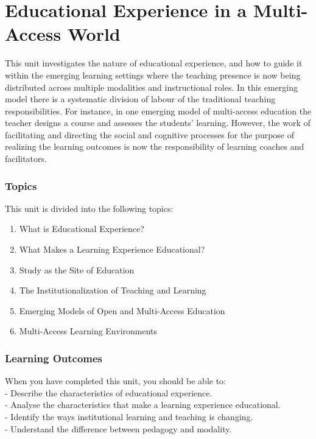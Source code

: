 \documentclass[
]{book}
\providecommand{\tightlist}{%
  \setlength{\itemsep}{0pt}\setlength{\parskip}{0pt}}
\begin{document}
\hypertarget{educational-experience-in-a-multi-access-world}{%
\chapter{Educational Experience in a Multi-Access World}\label{educational-experience-in-a-multi-access-world}}

This unit investigates the nature of educational experience, and how to guide it within the emerging learning settings where the teaching presence is now being distributed across multiple modalities and instructional roles. In this emerging model there is a systematic division of labour of the traditional teaching responsibilities. For instance, in one emerging model of multi-access education the teacher designs a course and assesses the students' learning. However, the work of facilitating and directing the social and cognitive processes for the purpose of realizing the learning outcomes is now the responsibility of learning coaches and facilitators.

\hypertarget{topics-4}{%
\subsection*{Topics}\label{topics-4}}

This unit is divided into the following topics:

\begin{enumerate}
\def\labelenumi{\arabic{enumi}.}
\tightlist
\item
  What is Educational Experience?
\item
  What Makes a Learning Experience Educational?
\item
  Study as the Site of Education
\item
  The Institutionalization of Teaching and Learning
\item
  Emerging Models of Open and Multi-Access Education
\item
  Multi-Access Learning Environments
\end{enumerate}

\hypertarget{learning-outcomes-3}{%
\subsection*{Learning Outcomes}\label{learning-outcomes-3}}

When you have completed this unit, you should be able to:\\
- Describe the characteristics of educational experience.\\
- Analyse the characteristics that make a learning experience educational.\\
- Identify the ways institutional learning and teaching is changing.\\
- Understand the difference between pedagogy and modality.
\end{document}
